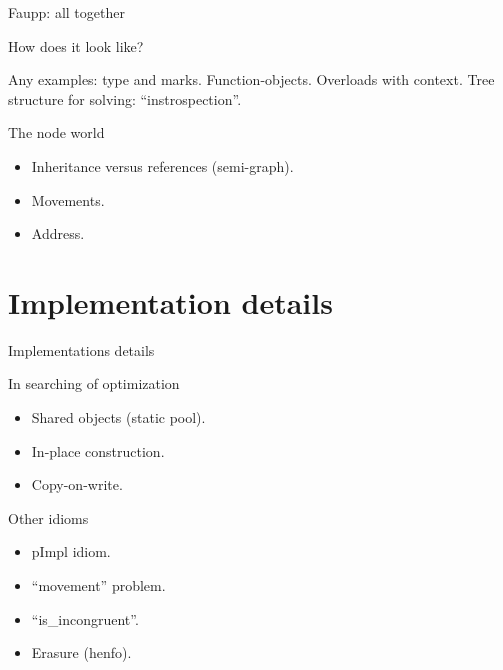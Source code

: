 \documentclass[12pt,xcolor=svgnames]{beamer}
\begin{document}
\begin{frame}{Faupp: all together}

  \begin{block}{How does it look like?}
    \begin{center}
      Any examples: type and marks. Function-objects. Overloads with
      context. Tree structure for solving: ``instrospection''.
    \end{center}
  \end{block}

  \pause

  \begin{block}{The node world}
    \begin{itemize}
      \item Inheritance versus references (semi-graph).
      \item Movements.
      \item Address.
    \end{itemize}
  \end{block}

\end{frame}

\section{Implementation details}

\begin{frame}{Implementations details}
  \begin{block}{In searching of optimization}
    \begin{itemize}
    \item Shared objects (static pool).
    \item In-place construction.
    \item Copy-on-write.
    \end{itemize}
  \end{block}

  \pause

  \begin{block}{Other idioms}
    \begin{itemize}
    \item pImpl idiom.
    \item ``movement'' problem.
    \item ``is\_incongruent''.
    \item Erasure (henfo).
    \end{itemize}
  \end{block}

\end{frame}
\end{document}
